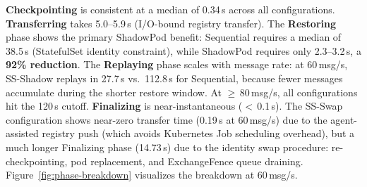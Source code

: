 \documentclass[conference]{IEEEtran}
\begin{document}
\textbf{Checkpointing} is consistent at a median of 0.34\,s across all
configurations. \textbf{Transferring} takes 5.0--5.9\,s (I/O-bound registry
transfer). The \textbf{Restoring} phase shows the primary ShadowPod benefit:
Sequential requires a median of 38.5\,s (StatefulSet identity constraint), while
ShadowPod requires only 2.3--3.2\,s, a \textbf{92\% reduction}. The
\textbf{Replaying} phase scales with message rate: at 60\,msg/s, SS-Shadow
replays in 27.7\,s vs.\ 112.8\,s for Sequential, because fewer messages
accumulate during the shorter restore window. At $\geq$\,80\,msg/s, all
configurations hit the 120\,s cutoff. \textbf{Finalizing} is near-instantaneous
($<$\,0.1\,s). The SS-Swap configuration shows near-zero transfer time (0.19\,s at 60\,msg/s) due to the agent-assisted registry push (which avoids Kubernetes Job scheduling overhead), but a much longer Finalizing phase (14.73\,s) due to the identity swap procedure: re-checkpointing, pod replacement, and ExchangeFence queue draining. Figure~\ref{fig:phase-breakdown} visualizes the breakdown at
60\,msg/s.
%
%
%
%
%
\end{document}
